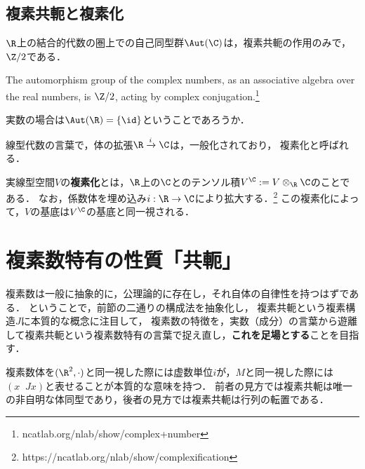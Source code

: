 \documentclass[uplatex, dvipdfmx]{jsreport}
\begin{document}
\subsection{複素共軛と複素化}

\begin{proposition}
    $\R$上の結合的代数の圏上での自己同型群$\Aut(\C)$は，複素共軛の作用のみで，$\Z/2$である．

    The automorphism group of the complex numbers, as an associative algebra over the real numbers, is $\Z/2$, acting by complex conjugation.\footnote{ncatlab.org/nlab/show/complex+number}
\end{proposition}
\begin{remark}
    実数の場合は$\Aut(\R)=\{\id\}$ということであろうか．
\end{remark}

線型代数の言葉で，体の拡張$\R\xrightarrow{i}\C$は，一般化されており，
複素化と呼ばれる．

\begin{definition}[complexification]
    実線型空間$V$の\textbf{複素化}とは，$\R$上の$\C$とのテンソル積$V^\C:=V\otimes_\R\C$のことである．
    なお，係数体を埋め込み$i:\R\to\C$により拡大する．\footnote{https://ncatlab.org/nlab/show/complexification}
    この複素化によって，$V$の基底は$V^\C$の基底と同一視される．
\end{definition}

\section{複素数特有の性質「共軛」}

\begin{screen}
    複素数は一般に抽象的に，公理論的に存在し，それ自体の自律性を持つはずである．
    ということで，前節の二通りの構成法を抽象化し，
    複素共軛という複素構造$J$に本質的な概念に注目して，
    複素数の特徴を，実数（成分）の言葉から遊離して複素共軛という複素数特有の言葉で捉え直し，\textbf{これを足場とする}ことを目指す．

    複素数体を$(\R^2,\cdot)$と同一視した際には虚数単位$i$が，$M$と同一視した際には$(x\;\;Jx)$と表せることが本質的な意味を持つ．
    前者の見方では複素共軛は唯一の非自明な体同型であり，後者の見方では複素共軛は行列の転置である．
\end{screen}
\end{document}
